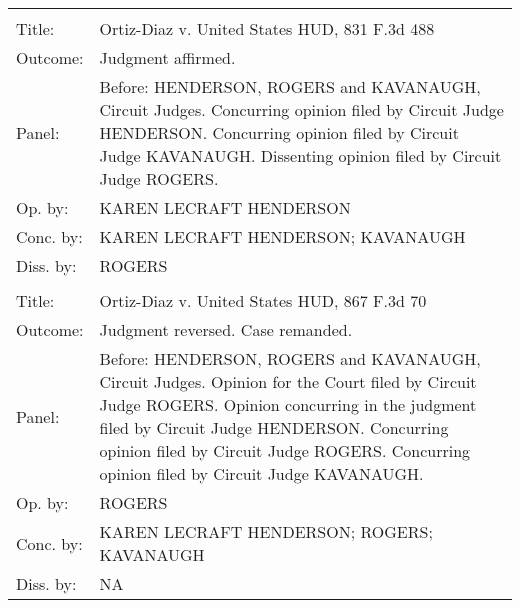 \documentclass[10pt, letterpaper]{article}
\begin{document}
\begin{spacing}{1.0}
\begin{footnotesize}
\begin{longtable}[H]{lp{6in}}
        \arrayrulecolor{black}\hline\\[-4pt]
        Title: & Ortiz-Diaz v. United States HUD, 831 F.3d 488\\[2pt]
        Outcome: & Judgment affirmed.\\[2pt]
        Panel: & Before: HENDERSON, ROGERS and KAVANAUGH, Circuit Judges. Concurring opinion filed by Circuit Judge HENDERSON. Concurring opinion filed by Circuit Judge KAVANAUGH. Dissenting opinion filed by Circuit Judge ROGERS.\\[2pt]
        Op. by: & KAREN LECRAFT HENDERSON\\[2pt]
        Conc. by: & KAREN LECRAFT HENDERSON; KAVANAUGH\\[2pt]
        Diss. by: & ROGERS\\[2pt]
        \arrayrulecolor{gray}\hline\\[-4pt]
        Title: & Ortiz-Diaz v. United States HUD, 867 F.3d 70\\[2pt]
        Outcome: & Judgment reversed. Case remanded.\\[2pt]
        Panel: & Before: HENDERSON, ROGERS and KAVANAUGH, Circuit Judges. Opinion for the Court filed by Circuit Judge ROGERS. Opinion concurring in the judgment filed by Circuit Judge HENDERSON. Concurring opinion filed by Circuit Judge ROGERS. Concurring opinion filed by Circuit Judge KAVANAUGH.\\[2pt]
        Op. by: & ROGERS\\[2pt]
        Conc. by: & KAREN LECRAFT HENDERSON; ROGERS; KAVANAUGH\\[2pt]
        Diss. by: & NA\\[2pt]
        

\end{longtable}
\end{footnotesize}
\end{spacing}
\end{document}
